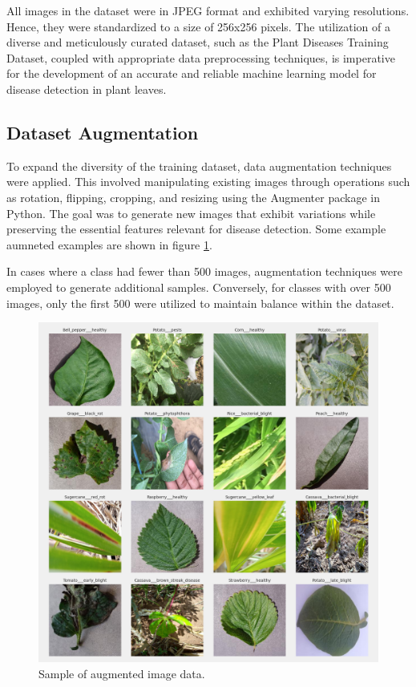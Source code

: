 \documentclass{article}
\begin{document}
All images in the dataset were in JPEG format and exhibited varying resolutions. Hence, they were standardized to a size of 256x256 pixels. The utilization of a diverse and meticulously curated dataset, such as the Plant Diseases Training Dataset, coupled with appropriate data preprocessing techniques, is imperative for the development of an accurate and reliable machine learning model for disease detection in plant leaves.


\subsection{Dataset Augmentation}
To expand the diversity of the training dataset, data augmentation techniques were applied. This involved manipulating existing images through operations such as rotation, flipping, cropping, and resizing using the Augmenter package in Python. The goal was to generate new images that exhibit variations while preserving the essential features relevant for disease detection. Some example aumneted examples are shown in figure \ref{fig:augmented_image}.

In cases where a class had fewer than 500 images, augmentation techniques were employed to generate additional samples. Conversely, for classes with over 500 images, only the first 500 were utilized to maintain balance within the dataset.

\begin{figure}[h]
    \centering
    \includegraphics[width=1.00\textwidth]{augmented_images_plot.png}
    \caption{Sample of augmented image data.}
    \label{fig:augmented_image}
\end{figure}
\end{document}
